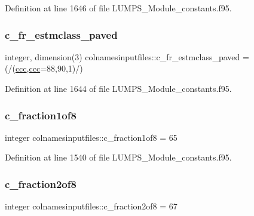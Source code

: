 Definition at line 1646 of file L\+U\+M\+P\+S\+\_\+\+Module\+\_\+constants.\+f95.

\mbox{\label{namespacecolnamesinputfiles_ae645bd421cc1a42b61bf2534373660e5}} 
\subsubsection{\texorpdfstring{c\+\_\+fr\+\_\+estmclass\+\_\+paved}{c\_fr\_estmclass\_paved}}
{\footnotesize\ttfamily integer, dimension(3) colnamesinputfiles\+::c\+\_\+fr\+\_\+estmclass\+\_\+paved = (/(\hyperlink{namespacecolnamesinputfiles_adb0ede73a6346d7e8fd56b1f1e3d1fc4}{ccc},\hyperlink{namespacecolnamesinputfiles_adb0ede73a6346d7e8fd56b1f1e3d1fc4}{ccc}=88,90,1)/)}



Definition at line 1644 of file L\+U\+M\+P\+S\+\_\+\+Module\+\_\+constants.\+f95.

\mbox{\label{namespacecolnamesinputfiles_ac2b1ccc8ae6ee69034ca23703f5557be}} 
\subsubsection{\texorpdfstring{c\+\_\+fraction1of8}{c\_fraction1of8}}
{\footnotesize\ttfamily integer colnamesinputfiles\+::c\+\_\+fraction1of8 = 65}



Definition at line 1540 of file L\+U\+M\+P\+S\+\_\+\+Module\+\_\+constants.\+f95.

\mbox{\label{namespacecolnamesinputfiles_a9e8fc5ec0c0d392b768329df0ba35ae8}} 
\subsubsection{\texorpdfstring{c\+\_\+fraction2of8}{c\_fraction2of8}}
{\footnotesize\ttfamily integer colnamesinputfiles\+::c\+\_\+fraction2of8 = 67}



